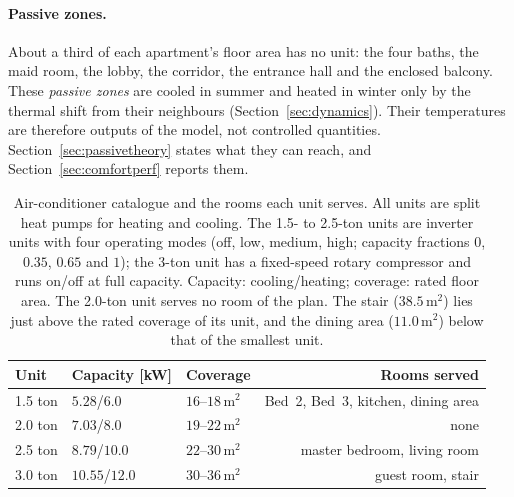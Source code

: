 \documentclass[10pt,a4paper,twocolumn]{article}
\theoremstyle{definition}
\begin{document}
\paragraph{Passive zones.}\label{sec:passive} About a third of each apartment's floor area has no unit: the four baths, the maid room, the lobby, the corridor, the entrance hall and the enclosed balcony. These \emph{passive zones} are cooled in summer and heated in winter only by the thermal shift from their neighbours (Section~\ref{sec:dynamics}). Their temperatures are therefore outputs of the model, not controlled quantities. Section~\ref{sec:passivetheory} states what they can reach, and Section~\ref{sec:comfortperf} reports them.

\begin{table}[!t]
\centering\footnotesize
\caption{Air-conditioner catalogue and the rooms each unit serves. All units are split heat pumps for heating and cooling. The 1.5- to 2.5-ton units are inverter units with four operating modes (off, low, medium, high; capacity fractions $0$, $0.35$, $0.65$ and $1$); the 3-ton unit has a fixed-speed rotary compressor and runs on/off at full capacity. Capacity: cooling/heating; coverage: rated floor area. The 2.0-ton unit serves no room of the plan. The stair ($38.5\,\text{m}^2$) lies just above the rated coverage of its unit, and the dining area ($11.0\,\text{m}^2$) below that of the smallest unit.}
\label{tab:acspec}
\setlength{\tabcolsep}{3pt}
\begin{tabularx}{\linewidth}{@{}l l l R@{}}
\toprule
Unit & Capacity [kW] & Coverage & Rooms served \\
 ton & $5.28$/$6.0$ & $16$--$18\,\text{m}^2$ & Bed~2, Bed~3, kitchen, dining area \\
2.0 ton & $7.03$/$8.0$ & $19$--$22\,\text{m}^2$ & none \\
2.5 ton & $8.79$/$10.0$ & $22$--$30\,\text{m}^2$ & master bedroom, living room \\
3.0 ton & $10.55$/$12.0$ & $30$--$36\,\text{m}^2$ & guest room, stair \\
\bottomrule
\end{tabularx}
\end{table}
\end{document}
